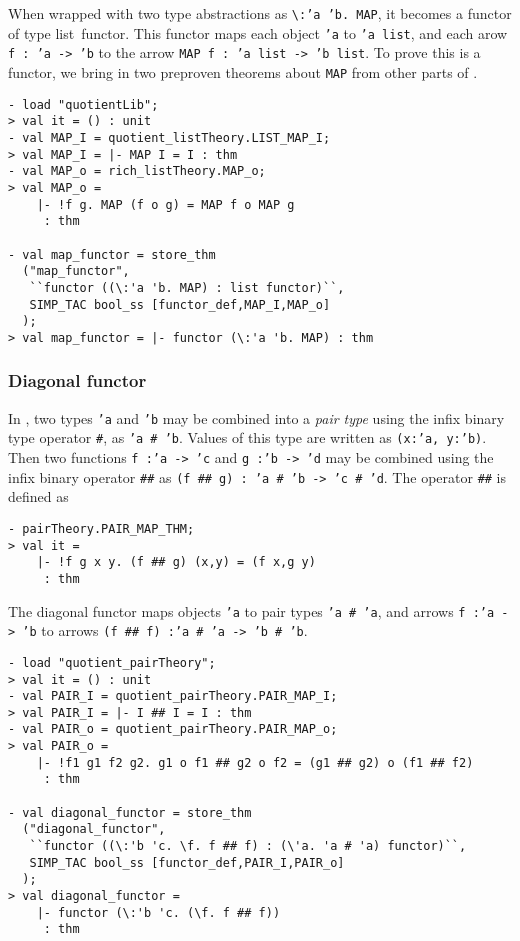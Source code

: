 \noindent
When wrapped with two type abstractions as
\verb|\|{\tt {:}'a~'b.~MAP},
it becomes a functor of type {\sf list~functor}.
This functor maps each object {\tt 'a} to {\tt 'a~list}, and
each arow {\tt f~:~'a~->~'b} to the arrow {\tt MAP~f~:~'a~list~->~'b~list}.
To prove this is a functor, we bring in two preproven theorems about {\tt MAP}
from other parts of \HOLW{}.
%
\begin{session}
\begin{verbatim}
- load "quotientLib";
> val it = () : unit
- val MAP_I = quotient_listTheory.LIST_MAP_I;
> val MAP_I = |- MAP I = I : thm
- val MAP_o = rich_listTheory.MAP_o;
> val MAP_o =
    |- !f g. MAP (f o g) = MAP f o MAP g
     : thm

- val map_functor = store_thm
  ("map_functor",
   ``functor ((\:'a 'b. MAP) : list functor)``,
   SIMP_TAC bool_ss [functor_def,MAP_I,MAP_o]
  );
> val map_functor = |- functor (\:'a 'b. MAP) : thm
\end{verbatim}
\end{session}

\subsubsection{Diagonal functor}

In \HOL{}, two types {\tt 'a} and {\tt 'b} may be combined into a
{\it pair type\/} using the infix binary type operator {\tt \#}, as
{\tt 'a \# 'b}.
Values of this type are written as {\tt (x:'a, y:'b)}.
Then two functions {\tt f~{:}'a~->~'c} and {\tt g~{:}'b~->~'d} may
be combined using the infix binary operator {\tt \#\#} as
{\tt (f \#\# g)~{:}~'a \# 'b -> 'c \# 'd}.
The operator {\tt \#\#} is defined as
\begin{session}
\begin{verbatim}
- pairTheory.PAIR_MAP_THM;
> val it =
    |- !f g x y. (f ## g) (x,y) = (f x,g y)
     : thm
\end{verbatim}
\end{session}

The diagonal functor maps objects {\tt 'a} to pair types {\tt 'a \# 'a},
and arrows {\tt f {:}'a~->~'b} to arrows {\tt (f \#\# f) {:}'a~\#~'a -> 'b~\#~'b}.
%
\begin{session}
\begin{verbatim}
- load "quotient_pairTheory";
> val it = () : unit
- val PAIR_I = quotient_pairTheory.PAIR_MAP_I;
> val PAIR_I = |- I ## I = I : thm
- val PAIR_o = quotient_pairTheory.PAIR_MAP_o;
> val PAIR_o =
    |- !f1 g1 f2 g2. g1 o f1 ## g2 o f2 = (g1 ## g2) o (f1 ## f2)
     : thm

- val diagonal_functor = store_thm
  ("diagonal_functor",
   ``functor ((\:'b 'c. \f. f ## f) : (\'a. 'a # 'a) functor)``,
   SIMP_TAC bool_ss [functor_def,PAIR_I,PAIR_o]
  );
> val diagonal_functor =
    |- functor (\:'b 'c. (\f. f ## f))
     : thm
\end{verbatim}
\end{session}

